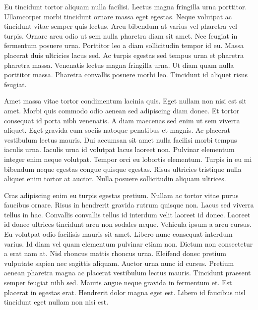 \documentclass[../Thesis]{subfiles}
\begin{document}
Eu tincidunt tortor aliquam nulla facilisi. Lectus magna fringilla urna porttitor. Ullamcorper morbi tincidunt ornare massa eget egestas. Neque volutpat ac tincidunt vitae semper quis lectus. Arcu bibendum at varius vel pharetra vel turpis. Ornare arcu odio ut sem nulla pharetra diam sit amet. Nec feugiat in fermentum posuere urna. Porttitor leo a diam sollicitudin tempor id eu. Massa placerat duis ultricies lacus sed. Ac turpis egestas sed tempus urna et pharetra pharetra massa. Venenatis lectus magna fringilla urna. Ut diam quam nulla porttitor massa. Pharetra convallis posuere morbi leo. Tincidunt id aliquet risus feugiat.

Amet massa vitae tortor condimentum lacinia quis. Eget nullam non nisi est sit amet. Morbi quis commodo odio aenean sed adipiscing diam donec. Et tortor consequat id porta nibh venenatis. A diam maecenas sed enim ut sem viverra aliquet. Eget gravida cum sociis natoque penatibus et magnis. Ac placerat vestibulum lectus mauris. Dui accumsan sit amet nulla facilisi morbi tempus iaculis urna. Iaculis urna id volutpat lacus laoreet non. Pulvinar elementum integer enim neque volutpat. Tempor orci eu lobortis elementum. Turpis in eu mi bibendum neque egestas congue quisque egestas. Risus ultricies tristique nulla aliquet enim tortor at auctor. Nulla posuere sollicitudin aliquam ultrices.

Cras adipiscing enim eu turpis egestas pretium. Nullam ac tortor vitae purus faucibus ornare. Risus in hendrerit gravida rutrum quisque non. Lacus sed viverra tellus in hac. Convallis convallis tellus id interdum velit laoreet id donec. Laoreet id donec ultrices tincidunt arcu non sodales neque. Vehicula ipsum a arcu cursus. Eu volutpat odio facilisis mauris sit amet. Libero nunc consequat interdum varius. Id diam vel quam elementum pulvinar etiam non. Dictum non consectetur a erat nam at. Nisl rhoncus mattis rhoncus urna. Eleifend donec pretium vulputate sapien nec sagittis aliquam. Auctor urna nunc id cursus. Pretium aenean pharetra magna ac placerat vestibulum lectus mauris. Tincidunt praesent semper feugiat nibh sed. Mauris augue neque gravida in fermentum et. Est placerat in egestas erat. Hendrerit dolor magna eget est. Libero id faucibus nisl tincidunt eget nullam non nisi est.
\end{document}
